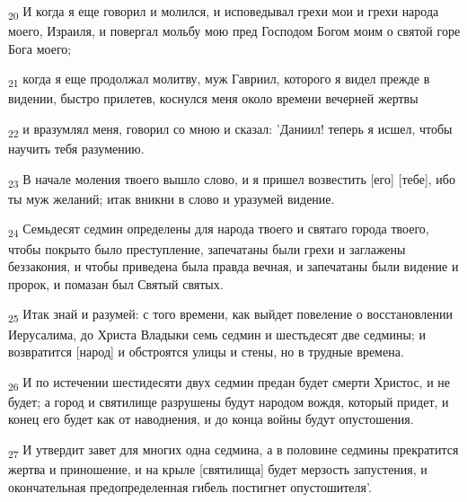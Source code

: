 \begin{tcolorbox}
\textsubscript{20} И когда я еще говорил и молился, и исповедывал грехи мои и грехи народа моего, Израиля, и повергал мольбу мою пред Господом Богом моим о святой горе Бога моего;
\end{tcolorbox}
\begin{tcolorbox}
\textsubscript{21} когда я еще продолжал молитву, муж Гавриил, которого я видел прежде в видении, быстро прилетев, коснулся меня около времени вечерней жертвы
\end{tcolorbox}
\begin{tcolorbox}
\textsubscript{22} и вразумлял меня, говорил со мною и сказал: 'Даниил! теперь я исшел, чтобы научить тебя разумению.
\end{tcolorbox}
\begin{tcolorbox}
\textsubscript{23} В начале моления твоего вышло слово, и я пришел возвестить [его] [тебе], ибо ты муж желаний; итак вникни в слово и уразумей видение.
\end{tcolorbox}
\begin{tcolorbox}
\textsubscript{24} Семьдесят седмин определены для народа твоего и святаго города твоего, чтобы покрыто было преступление, запечатаны были грехи и заглажены беззакония, и чтобы приведена была правда вечная, и запечатаны были видение и пророк, и помазан был Святый святых.
\end{tcolorbox}
\begin{tcolorbox}
\textsubscript{25} Итак знай и разумей: с того времени, как выйдет повеление о восстановлении Иерусалима, до Христа Владыки семь седмин и шестьдесят две седмины; и возвратится [народ] и обстроятся улицы и стены, но в трудные времена.
\end{tcolorbox}
\begin{tcolorbox}
\textsubscript{26} И по истечении шестидесяти двух седмин предан будет смерти Христос, и не будет; а город и святилище разрушены будут народом вождя, который придет, и конец его будет как от наводнения, и до конца войны будут опустошения.
\end{tcolorbox}
\begin{tcolorbox}
\textsubscript{27} И утвердит завет для многих одна седмина, а в половине седмины прекратится жертва и приношение, и на крыле [святилища] будет мерзость запустения, и окончательная предопределенная гибель постигнет опустошителя'.
\end{tcolorbox}
